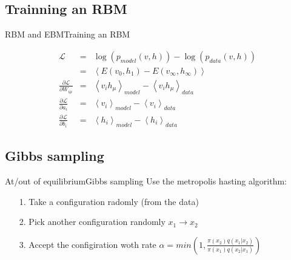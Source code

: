 \documentclass{beamer}
\begin{document}
\subsection{Trainning an RBM}
\begin{frame}{RBM and EBM}{Training an RBM}

\begin{eqnarray}
	\mathcal{L} & = & \log( p_{model}(v,h) ) - \log( p_{data}(v,h)) \\
    & = &  \left< E(v_0, h_1) - E(v_{\infty}, h_{\infty})  \right> \nonumber\\
    \frac{\partial \mathcal{L}}{\partial W_{i\mu}} &=& \left< v_i h_\mu \right>_{model} - \left< v_i h_\mu \right>_{data} \\
    \frac{ \partial \mathcal{L}}{\partial a_i} & = & \left< v_i\right>_{model} - \left< v_i \right>_{data} \\
    \frac{ \partial \mathcal{L}}{\partial b_i} & = & \left< h_i \right>_{model} - \left< h_i \right>_{data}
\end{eqnarray}

\end{frame}



\subsection{Gibbs sampling}

\begin{frame}{At/out of equilibrium}{Gibbs sampling}
Use the metropolis hasting algorithm: 
\begin{itemize}
    \item[1.] Take a configuration radomly (from the data)
    \item[2.] Pick another configuration randomly $x_1 \rightarrow x_2$
    \item[3.] Accept the configiration woth rate \cite{NR2006} $\alpha = min \left( 1, \frac{\pi(x_2)q(x_1 \vert x_2)}{\pi(x_1) q(x_2 \vert x_1)} \right)$
\end{itemize}
\end{frame}
\end{document}
